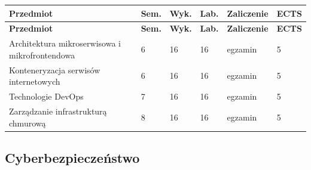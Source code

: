 \documentclass[12pt,a4paper]{article}
\newcommand{\thdrule}{\noalign{\global\setlength{\extrarowheight}{0pt}}}
\newcommand{\thdend}{\noalign{\global\setlength{\extrarowheight}{4pt}}}
\begin{document}
{\scriptsize
\begin{longtable}{m{6.5cm}m{0.7cm}m{1cm}m{1cm}m{1.7cm}m{0.7cm}}
\thdrule\toprule
\rowcolor{pjatkRed}
{\color{white}\footnotesize\textbf{\vphantom{Ag}Przedmiot}} & {\color{white}\footnotesize\textbf{\vphantom{Ag}Sem.}} & {\color{white}\footnotesize\textbf{\vphantom{Ag}Wyk.}} & {\color{white}\footnotesize\textbf{\vphantom{Ag}Lab.}} & {\color{white}\footnotesize\textbf{\vphantom{Ag}Zaliczenie}} & {\color{white}\footnotesize\textbf{\vphantom{Ag}ECTS}} \\
\midrule\thdend
\endfirsthead
\thdrule\toprule
\rowcolor{pjatkRed}
{\color{white}\footnotesize\textbf{\vphantom{Ag}Przedmiot}} & {\color{white}\footnotesize\textbf{\vphantom{Ag}Sem.}} & {\color{white}\footnotesize\textbf{\vphantom{Ag}Wyk.}} & {\color{white}\footnotesize\textbf{\vphantom{Ag}Lab.}} & {\color{white}\footnotesize\textbf{\vphantom{Ag}Zaliczenie}} & {\color{white}\footnotesize\textbf{\vphantom{Ag}ECTS}} \\
\midrule\thdend
\endhead
\rowcolor{tableRowLight} Architektura mikroserwisowa i mikrofrontendowa & 6 & 16 & 16 & {\scriptsize egzamin} & 5 \\
\rowcolor{tableRowAlt} Konteneryzacja serwisów internetowych & 6 & 16 & 16 & {\scriptsize egzamin} & 5 \\
\rowcolor{tableRowLight} Technologie DevOps & 7 & 16 & 16 & {\scriptsize egzamin} & 5 \\
\rowcolor{tableRowAlt} Zarządzanie infrastrukturą chmurową & 8 & 16 & 16 & {\scriptsize egzamin} & 5 \\
\bottomrule
\end{longtable}}

\subsection*{Cyberbezpieczeństwo}
\end{document}
